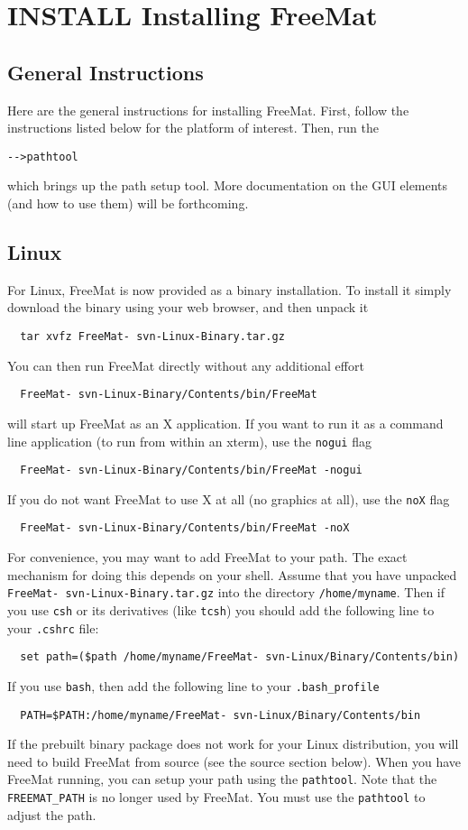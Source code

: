 \section{INSTALL Installing FreeMat}

\subsection{General Instructions}

Here are the general instructions for installing FreeMat.  First, follow the 
instructions listed below for the platform of interest.  Then, run the
\begin{verbatim}
-->pathtool
\end{verbatim}
which brings up the path setup tool.  More documentation on the GUI elements
(and how to use them) will be forthcoming.  
\subsection{Linux}

For Linux, FreeMat is now provided as a binary installation.  To install it
simply download the binary using your web browser, and then unpack it
\begin{verbatim}
  tar xvfz FreeMat- svn-Linux-Binary.tar.gz
\end{verbatim}
You can then run FreeMat directly without any additional effort
\begin{verbatim}
  FreeMat- svn-Linux-Binary/Contents/bin/FreeMat
\end{verbatim}
will start up FreeMat as an X application.  If you want to run it
as a command line application (to run from within an xterm), use
the \verb|nogui| flag
\begin{verbatim}
  FreeMat- svn-Linux-Binary/Contents/bin/FreeMat -nogui
\end{verbatim}
If you do not want FreeMat to use X at all (no graphics at all), use
the \verb|noX| flag
\begin{verbatim}
  FreeMat- svn-Linux-Binary/Contents/bin/FreeMat -noX
\end{verbatim}
For convenience, you may want to add FreeMat to your path.  The exact
mechanism for doing this depends on your shell.  Assume that you have
unpacked \verb|FreeMat- svn-Linux-Binary.tar.gz| into the directory
\verb|/home/myname|.  Then if you use \verb|csh| or its derivatives (like \verb|tcsh|)
you should add the following line to your \verb|.cshrc| file:
\begin{verbatim}
  set path=($path /home/myname/FreeMat- svn-Linux/Binary/Contents/bin)
\end{verbatim}
If you use \verb|bash|, then add the following line to your \verb|.bash_profile|
\begin{verbatim}
  PATH=$PATH:/home/myname/FreeMat- svn-Linux/Binary/Contents/bin
\end{verbatim}
If the prebuilt binary package does not work for your Linux distribution, you
will need to build FreeMat from source (see the source section below).  When
you have FreeMat running, you can setup your path using the \verb|pathtool|.  Note
that the \verb|FREEMAT_PATH| is no longer used by FreeMat.  You must use the \verb|pathtool|
to adjust the path.
